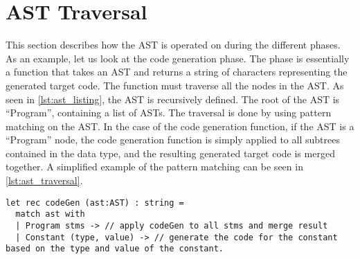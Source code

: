 \section{AST Traversal}

This section describes how the AST is operated on during the different phases. As an example, let us look at the code generation phase. The phase is essentially a function that takes an AST and returns a string of characters representing the generated target code. The function must traverse all the nodes in the AST. As seen in \cref{lst:ast_listing}, the AST is recursively defined. The root of the AST is \enquote{Program}, containing a list of ASTs. The traversal is done by using pattern matching on the AST. In the case of the code generation function, if the AST is a \enquote{Program} node, the code generation function is simply applied to all subtrees contained in the data type, and the resulting generated target code is merged together. A simplified example of the pattern matching can be seen in \cref{lst:ast_traversal}.

\begin{lstlisting}[style = fsharp, label = lst:ast_traversal, caption = {Example of traversing AST}]
let rec codeGen (ast:AST) : string =
  match ast with
  | Program stms -> // apply codeGen to all stms and merge result
  | Constant (type, value) -> // generate the code for the constant based on the type and value of the constant.
\end{lstlisting}